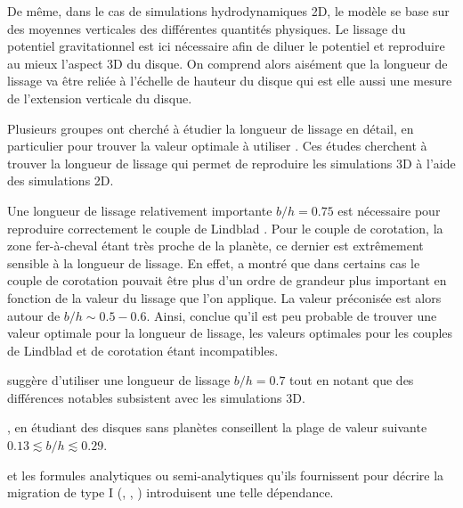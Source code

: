 De même, dans le cas de simulations hydrodynamiques 2D, le modèle se base sur des moyennes verticales des différentes quantités
physiques. Le lissage du potentiel gravitationnel est ici nécessaire afin de diluer le potentiel et reproduire au mieux l'aspect
3D du disque. On comprend alors aisément que la longueur de lissage va être reliée à l'échelle de hauteur du disque qui est elle
aussi une mesure de l'extension verticale du disque. 

Plusieurs groupes ont cherché à étudier la longueur de lissage en détail, en particulier pour trouver la valeur optimale à
utiliser \citep{hure2009local, muller2012treating}. Ces études cherchent à trouver la longueur de lissage qui permet de
reproduire les simulations 3D à l'aide des simulations 2D. 

Une longueur de lissage relativement importante $b/h = 0.75$ est nécessaire pour reproduire correctement le couple de Lindblad
\citep{masset2002coorbital}. Pour le couple de corotation, la zone fer-à-cheval étant très proche de la planète, ce dernier est
extrêmement sensible à la longueur de lissage. En effet, \cite{masset2002coorbital} a montré que dans certains cas le couple de
corotation pouvait être plus d'un ordre de grandeur plus important en fonction de la valeur du lissage que l'on applique. La
valeur préconisée est alors autour de $b/h\sim 0.5-0.6$. Ainsi, \cite{masset2002coorbital} conclue qu'il est peu probable de
trouver une valeur optimale pour la longueur de lissage, les valeurs optimales pour les couples de Lindblad et de corotation
étant incompatibles. 

\cite{muller2012treating} suggère d'utiliser une longueur de lissage $b/h = 0.7$ tout en notant que des différences notables
subsistent avec les simulations 3D. 

\cite{hure2009local}, en étudiant des disques sans planètes conseillent la plage de valeur suivante $0.13 \lesssim b/h \lesssim
0.29$.

\bigskip

\cite{paardekooper2010torque, paardekooper2011torque} et les formules analytiques ou semi-analytiques qu'ils fournissent pour
décrire la migration de type I (, ,
) introduisent une telle dépendance. 

